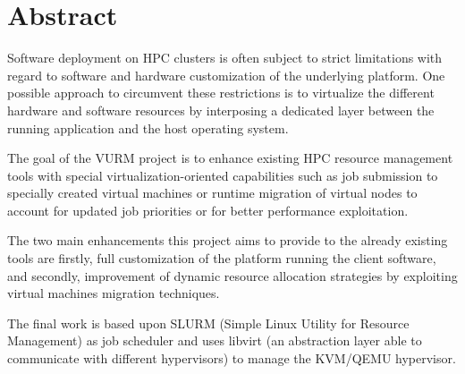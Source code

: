 \chapter*{\centering\Large Abstract}
\vspace{-20pt}

Software deployment on HPC clusters is often subject to strict limitations with regard to software and hardware customization of the underlying platform. One possible approach to circumvent these restrictions is to virtualize the different hardware and software resources by interposing a dedicated layer between the running application and the host operating system.

The goal of the VURM project is to enhance existing HPC resource management tools with special virtualization-oriented capabilities such as job submission to specially created virtual machines or runtime migration of virtual nodes to account for updated job priorities or for better performance exploitation.

The two main enhancements this project aims to provide to the already existing tools are firstly, full customization of the platform running the client software, and secondly, improvement of dynamic resource allocation strategies by exploiting virtual machines migration techniques.

The final work is based upon SLURM (Simple Linux Utility for Resource Management) as job scheduler and uses libvirt (an abstraction layer able to communicate with different hypervisors) to manage the KVM/QEMU hypervisor.

